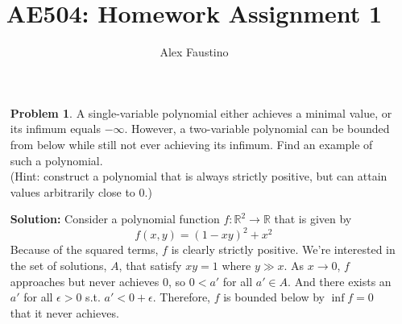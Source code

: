 \documentclass[12pt,letterpaper]{article}
\title{AE504: Homework Assignment 1}
\author{Alex Faustino}
\begin{document}
\maketitle
\thispagestyle{empty}

\begin{enumerate}
    \item[\textbf{Problem 1}.] {
    A single-variable polynomial either achieves a minimal value, or its infimum equals $-\infty$. However, a two-variable polynomial can be bounded from below while still not ever achieving its infimum. Find an example of such a polynomial. \\
    (Hint: construct a polynomial that is always strictly positive, but can attain values arbitrarily close to $0$.)
    }
    \item[\textbf{Solution:}] {
    Consider a polynomial function $f:\mathbb{R}^2\to\mathbb{R}$ that is given by \begin{equation*}
        f(x,y)=(1-xy)^2+x^2
    \end{equation*}
    Because of the squared terms, $f$ is clearly strictly positive. We're interested in the set of solutions, $A$, that satisfy $xy=1$ where $y \gg x$. As $x\to0$, $f$ approaches but never achieves $0$, so $0<a'$ for all $a'\in A$. And there exists an $a'$ for all $\epsilon > 0$ s.t. $a'< 0 + \epsilon$. Therefore, $f$ is bounded below by $\inf f = 0$ that it never achieves.
    }
    

\end{enumerate}
\end{document}
